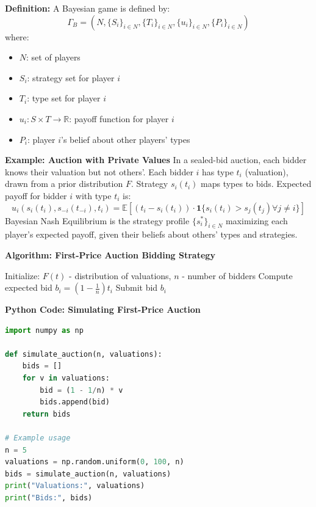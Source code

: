 \documentclass[12pt]{book} %
\begin{document}
\textbf{Definition:}
A Bayesian game is defined by:
\[ \Gamma_B = (N, \{S_i\}_{i \in N}, \{T_i\}_{i \in N}, \{u_i\}_{i \in N}, \{P_i\}_{i \in N}) \]
where:
\begin{itemize}
    \item $N$: set of players
    \item $S_i$: strategy set for player $i$
    \item $T_i$: type set for player $i$
    \item $u_i: S \times T \to \mathbb{R}$: payoff function for player $i$
    \item $P_i$: player $i$'s belief about other players' types
\end{itemize}

\textbf{Example: Auction with Private Values}
In a sealed-bid auction, each bidder knows their valuation but not others'. Each bidder $i$ has type $t_i$ (valuation), drawn from a prior distribution $F$. Strategy $s_i(t_i)$ maps types to bids. Expected payoff for bidder $i$ with type $t_i$ is:
\[ u_i(s_i(t_i), s_{-i}(t_{-i}), t_i) = \mathbb{E}[(t_i - s_i(t_i)) \cdot \mathbf{1}\{s_i(t_i) > s_j(t_j) \forall j \neq i\}] \]
Bayesian Nash Equilibrium is the strategy profile $\{s_i^*\}_{i \in N}$ maximizing each player's expected payoff, given their beliefs about others' types and strategies.


\textbf{Algorithm: First-Price Auction Bidding Strategy}
\FloatBarrier
\begin{algorithm}
\caption{Bidding Strategy in a First-Price Sealed-Bid Auction}
\begin{algorithmic}[1]
\State Initialize: $F(t)$ - distribution of valuations, $n$ - number of bidders
    \State Compute expected bid $b_i = \left(1 - \frac{1}{n}\right)t_i$
    \State Submit bid $b_i$
\EndFor
\end{algorithmic}
\end{algorithm}

\FloatBarrier

\textbf{Python Code: Simulating First-Price Auction}
\begin{lstlisting}[language=Python]
import numpy as np

def simulate_auction(n, valuations):
    bids = []
    for v in valuations:
        bid = (1 - 1/n) * v
        bids.append(bid)
    return bids

# Example usage
n = 5
valuations = np.random.uniform(0, 100, n)
bids = simulate_auction(n, valuations)
print("Valuations:", valuations)
print("Bids:", bids)
\end{lstlisting}
\end{document}
